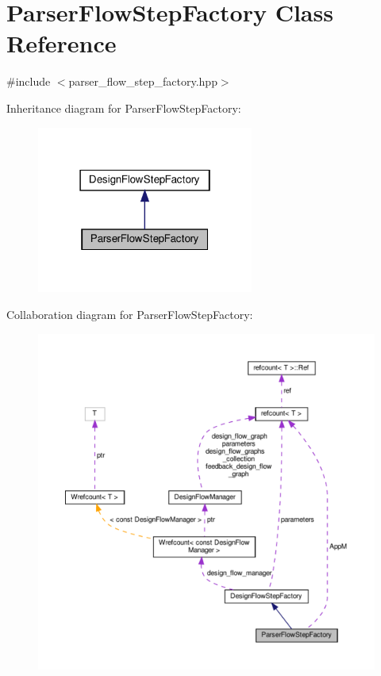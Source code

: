 \hypertarget{classParserFlowStepFactory}{}\section{Parser\+Flow\+Step\+Factory Class Reference}
\label{classParserFlowStepFactory}


{\ttfamily \#include $<$parser\+\_\+flow\+\_\+step\+\_\+factory.\+hpp$>$}



Inheritance diagram for Parser\+Flow\+Step\+Factory\+:
\nopagebreak
\begin{figure}[H]
\begin{center}
\leavevmode
\includegraphics[width=202pt]{d6/d8f/classParserFlowStepFactory__inherit__graph}
\end{center}
\end{figure}


Collaboration diagram for Parser\+Flow\+Step\+Factory\+:
\nopagebreak
\begin{figure}[H]
\begin{center}
\leavevmode
\includegraphics[width=350pt]{d2/dde/classParserFlowStepFactory__coll__graph}
\end{center}
\end{figure}
